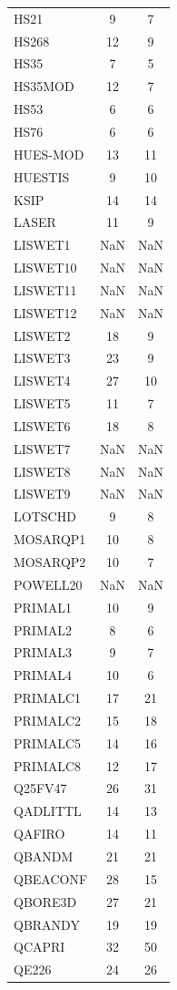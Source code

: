 \begin{longtable}{lcc}
HS21 & 9 & 7 \\
HS268 & 12 & 9 \\
HS35 & 7 & 5 \\
HS35MOD & 12 & 7 \\
HS53 & 6 & 6 \\
HS76 & 6 & 6 \\
HUES-MOD & 13 & 11 \\
HUESTIS & 9 & 10 \\
KSIP & 14 & 14 \\
LASER & 11 & 9 \\
LISWET1 & NaN & NaN \\
LISWET10 & NaN & NaN \\
LISWET11 & NaN & NaN \\
LISWET12 & NaN & NaN \\
LISWET2 & 18 & 9 \\
LISWET3 & 23 & 9 \\
LISWET4 & 27 & 10 \\
LISWET5 & 11 & 7 \\
LISWET6 & 18 & 8 \\
LISWET7 & NaN & NaN \\
LISWET8 & NaN & NaN \\
LISWET9 & NaN & NaN \\
LOTSCHD & 9 & 8 \\
MOSARQP1 & 10 & 8 \\
MOSARQP2 & 10 & 7 \\
POWELL20 & NaN & NaN \\
PRIMAL1 & 10 & 9 \\
PRIMAL2 & 8 & 6 \\
PRIMAL3 & 9 & 7 \\
PRIMAL4 & 10 & 6 \\
PRIMALC1 & 17 & 21 \\
PRIMALC2 & 15 & 18 \\
PRIMALC5 & 14 & 16 \\
PRIMALC8 & 12 & 17 \\
Q25FV47 & 26 & 31 \\
QADLITTL & 14 & 13 \\
QAFIRO & 14 & 11 \\
QBANDM & 21 & 21 \\
QBEACONF & 28 & 15 \\
QBORE3D & 27 & 21 \\
QBRANDY & 19 & 19 \\
QCAPRI & 32 & 50 \\
QE226 & 24 & 26 \\

\end{longtable}
